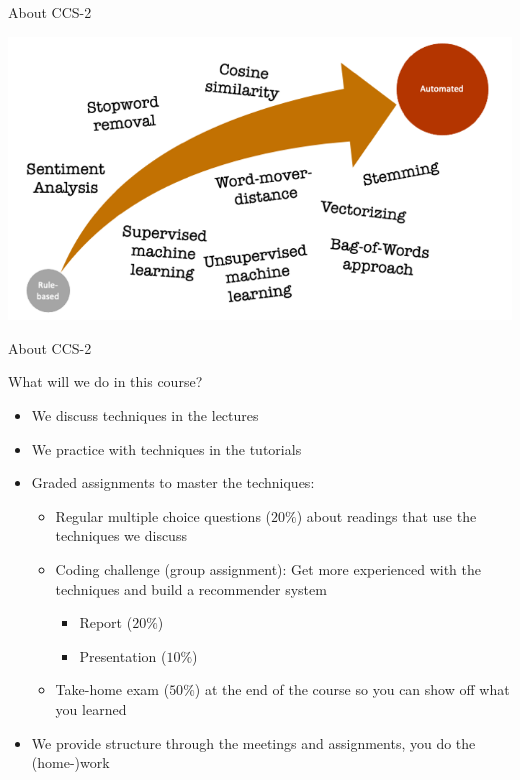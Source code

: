 \documentclass[handout]{beamer}
\begin{document}
\begin{frame}{About CCS-2}
	
	\begin{center}
		\includegraphics[width=\linewidth,height=\textheight,keepaspectratio]{../pictures/Roadmap_terms.png} 
	\end{center}
	
\end{frame}


\begin{frame}{About CCS-2} 

What will we do in this course?	
	\begin{itemize}
		\item We discuss techniques in the lectures
		\item We practice with techniques in the tutorials
		\item Graded assignments to master the techniques:
		\begin{itemize}
			\item Regular multiple choice questions (\(20\%\)) about readings that use the techniques we discuss
			\item Coding challenge (group assignment): Get more experienced with the techniques and build a recommender system
			\begin{itemize}
				\item Report (\(20\%\))
				\item Presentation (\(10\%\))
			\end{itemize}
			\item Take-home exam (\(50\%\)) at the end of the course so you can show off what you learned
		\end{itemize}
		\item We provide structure through the meetings and assignments, you do the (home-)work
	\end{itemize}
	
\end{frame}
\end{document}
